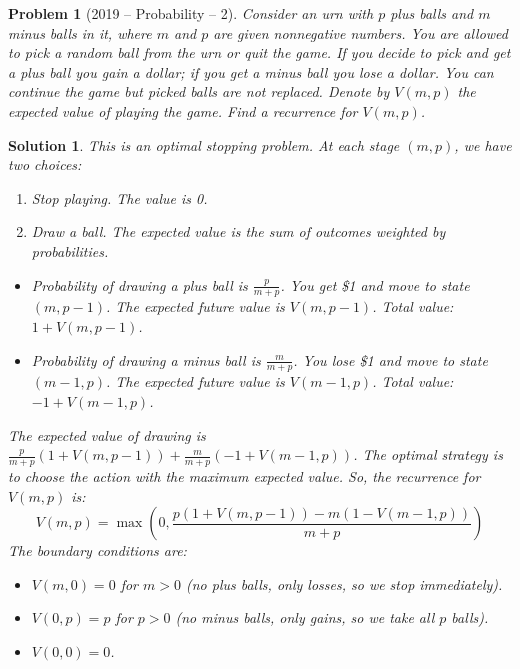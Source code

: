 \documentclass[12pt]{amsart}
\newtheorem{problem}{Problem}
\newtheorem*{solution}{Solution}
\begin{document}
\begin{problem}[2019 -- Probability -- 2]
Consider an urn with $p$ plus balls and $m$ minus balls in it, where $m$ and $p$ are given nonnegative numbers. You are allowed to pick a random ball from the urn or quit the game. If you decide to pick and get a plus ball you gain a dollar; if you get a minus ball you lose a dollar. You can continue the game but picked balls are not replaced. Denote by $V(m, p)$ the expected value of playing the game. Find a recurrence for $V(m, p)$.
\end{problem}
\begin{solution}
This is an optimal stopping problem. At each stage $(m, p)$, we have two choices:
\begin{enumerate}
\item Stop playing. The value is 0.
\item Draw a ball. The expected value is the sum of outcomes weighted by probabilities.
\end{enumerate}

\begin{itemize}
\item Probability of drawing a plus ball is $\frac{p}{m+p}$. You get \$1 and move to state $(m, p-1)$. The expected future value is $V(m, p-1)$. Total value: $1+V(m, p-1)$.
\item Probability of drawing a minus ball is $\frac{m}{m+p}$. You lose \$1 and move to state $(m-1, p)$. The expected future value is $V(m-1, p)$. Total value: $-1+V(m-1, p)$.
\end{itemize}
The expected value of drawing is $\frac{p}{m+p}(1+V(m, p-1)) + \frac{m}{m+p}(-1+V(m-1, p))$.
The optimal strategy is to choose the action with the maximum expected value.
So, the recurrence for $V(m, p)$ is:
$$ V(m, p) = \max\left(0, \frac{p(1+V(m, p-1)) - m(1-V(m-1, p))}{m+p}\right) $$
The boundary conditions are:
\begin{itemize}
\item $V(m, 0) = 0$ for $m > 0$ (no plus balls, only losses, so we stop immediately).
\item $V(0, p) = p$ for $p > 0$ (no minus balls, only gains, so we take all $p$ balls).
\item $V(0,0)=0$.
\end{itemize}
\end{solution}
\end{document}
